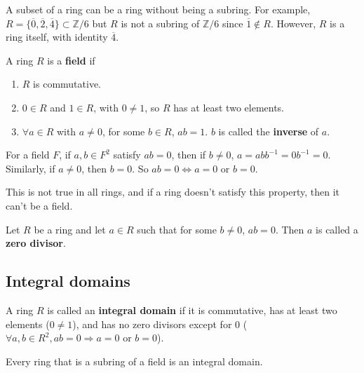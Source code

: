 \begin{example}
	A subset of a ring can be a ring without being a subring. For example, $R = \{ \overline{0}, \overline{2}, \overline{4} \} \subset \mathbb{Z} / 6$ but $R$ is not a subring of $\mathbb{Z} / 6$ since $\overline{1} \notin R$. However, $R$ is a ring itself, with identity $\overline{4}$.
\end{example}

\begin{definition}
	A ring $R$ is a \textbf{field} if
	\begin{enumerate}
		\item $R$ is commutative.
		\item $0 \in R$ and $1 \in R$, with $0 \ne 1$, so $R$ has at least two elements.
		\item $\forall a \in R$ with $a \ne 0$, for some $b \in R$, $ab = 1$. $b$ is called the \textbf{inverse} of $a$.
	\end{enumerate}
\end{definition}

\begin{remark}
	For a field $F$, if $a, b \in F^2$ satisfy $ab = 0$, then if $b \ne 0$, $a = ab b^{-1} = 0 b^{-1} = 0$. Similarly, if $a \ne 0$, then $b = 0$. So $ab = 0 \Longleftrightarrow a = 0 \text{ or } b = 0$.

	This is not true in all rings, and if a ring doesn't satisfy this property, then it can't be a field.
\end{remark}

\begin{definition}
	Let $R$ be a ring and let $a \in R$ such that for some $b \ne 0$, $ab = 0$. Then $a$ is called a \textbf{zero divisor}.
\end{definition}

\subsection{Integral domains}

\begin{definition}\label{def:integralDomain}
	A ring $R$ is called an \textbf{integral domain} if it is commutative, has at least two elements ($0 \ne 1$), and has no zero divisors except for $0$ ($\forall a, b \in R^2, ab = 0 \Longrightarrow a = 0 \text{ or } b = 0$).
\end{definition}

\begin{remark}
	Every ring that is a subring of a field is an integral domain.
\end{remark}

